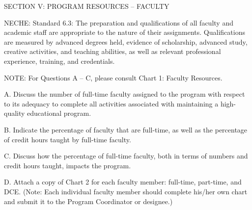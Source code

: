 SECTION V: PROGRAM RESOURCES – FACULTY

NECHE:  Standard 6.3: The preparation and qualifications of all faculty and academic staff are appropriate to the nature of their assignments. Qualifications are measured by advanced degrees held, evidence of scholarship, advanced study, creative activities, and teaching abilities, as well as relevant professional experience, training, and credentials.

NOTE: For Questions A – C, please consult Chart 1: Faculty Resources.

A. Discuss the number of full-time faculty assigned to the program with respect to its adequacy to complete all activities associated with maintaining a high-quality educational program. 



B. Indicate the percentage of faculty that are full-time, as well as the percentage of credit hours taught by full-time faculty. 



C. Discuss how the percentage of full-time faculty, both in terms of numbers and credit hours taught, impacts the program.



D. Attach a copy of Chart 2 for each faculty member: full-time, part-time, and DCE. (Note: Each individual faculty member should complete his/her own chart and submit it to the Program Coordinator or designee.) 
